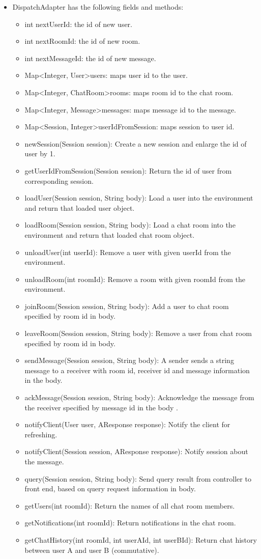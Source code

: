 \documentclass[letterpaper, 11pt]{article}
\begin{document}
\begin{itemize}
\item DispatchAdapter has the following fields and methods:
\begin{itemize}
\item int nextUserId: the id of new user.
\item int nextRoomId: the id of new room.
\item int nextMessageId: the id of new message.
\item Map\textless Integer, User\textgreater users: maps user id to the user.
\item Map\textless Integer, ChatRoom\textgreater rooms: maps room id to the chat room. 
\item Map\textless Integer, Message\textgreater messages: maps message id to the message. 
\item Map\textless Session, Integer\textgreater userIdFromSession: maps session to user id. 
\item newSession(Session session): Create a new session and enlarge the id of user by 1.
\item getUserIdFromSession(Session session): Return the id of user from corresponding session.
\item loadUser(Session session, String body): Load a user into the environment and return that loaded user object.
\item loadRoom(Session session, String body): Load a chat room into the environment and return that loaded chat room object.
\item unloadUser(int userId): Remove a user with given userId from the environment.
\item unloadRoom(int roomId): Remove a room with given roomId from the environment.
\item joinRoom(Session session, String body): Add a user to chat room specified by room id in body.
\item leaveRoom(Session session, String body): Remove a user from chat room specified by room id in body.
\item sendMessage(Session session, String body): A sender sends a string message to a receiver with room id, receiver id and message information in the body.
\item ackMessage(Session session, String body): Acknowledge the message from the receiver specified by message id in the body .
\item notifyClient(User user, AResponse response): Notify the client for refreshing.
\item notifyClient(Session session, AResponse response): Notify session about the message.
\item query(Session session, String body): Send query result from controller to front end, based on query request information in body.
\item getUsers(int roomId): Return the names of all chat room members.
\item getNotifications(int roomId): Return notifications in the chat room.
\item getChatHistory(int roomId, int userAId, int userBId): Return chat history between user A and user B (commutative).
\end{itemize}


\end{itemize}
\end{document}
